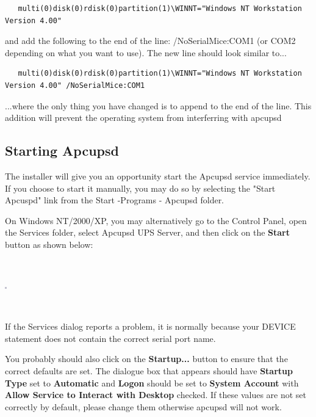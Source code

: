{{{{{{{{{\begin{verbatim}
   multi(0)disk(0)rdisk(0)partition(1)\WINNT="Windows NT Workstation Version 4.00"
\end{verbatim}

and add the following to the end of the line: /NoSerialMice:COM1 (or COM2
depending on what you want to use). The new line should look similar to...

\begin{verbatim}
   multi(0)disk(0)rdisk(0)partition(1)\WINNT="Windows NT Workstation Version 4.00" /NoSerialMice:COM1  
\end{verbatim}

...where the only thing you have changed is to append to the end of the line.
This addition will prevent the operating system from interferring with apcupsd


\label{Starting Apcupsd}
\subsection*{Starting Apcupsd}

The installer will give you an opportunity start the Apcupsd service
immediately. If you choose to start it manually, you may do so by selecting
the "Start Apcuspd" link from the Start -\gt{}Programs -\gt{} Apcupsd folder.

On Windows NT/2000/XP, you may alternatively go to the Control Panel, open
the Services folder, select Apcupsd UPS Server, and then click on the
{\bf Start} button as shown below:

\footnotesize
\begin{verbatim}
     
\end{verbatim}
\normalsize

\includegraphics{./wininstall6.eps}  

\footnotesize
\begin{verbatim}
     
\end{verbatim}
\normalsize

If the Services dialog reports a problem, it is normally because your DEVICE
statement does not contain the correct serial port name. 

You probably should also click on the {\bf Startup...} button to ensure that
the correct defaults are set. The dialogue box that appears should have {\bf
Startup Type} set to {\bf Automatic} and {\bf Logon} should be set to {\bf
System Account} with {\bf Allow Service to Interact with Desktop} checked. If
these values are not set correctly by default, please change them otherwise
apcupsd will not work.  

}}}}}}}}}
